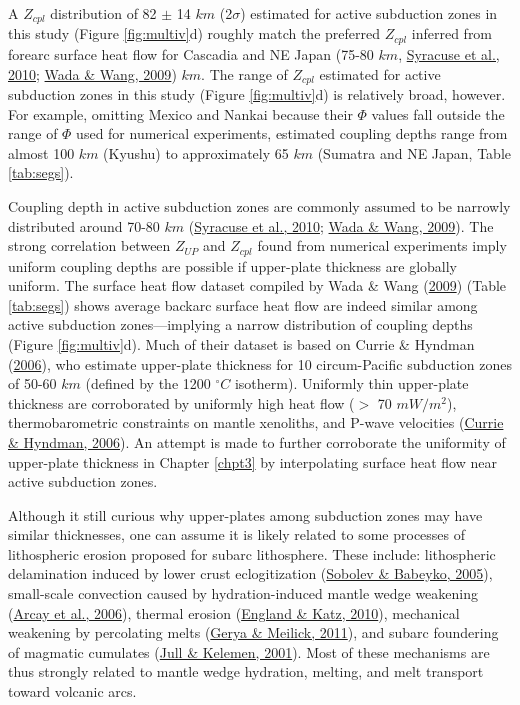 A \(Z_{cpl}\) distribution of 82 \(\pm\) 14 \(km\) (2\(\sigma\)) estimated for active subduction zones in this study (Figure \ref{fig:multiv}d) roughly match the preferred \(Z_{cpl}\) inferred from forearc surface heat flow for Cascadia and NE Japan (75-80 \(km\), \protect\hyperlink{ref-syracuse2010}{Syracuse et al., 2010}; \protect\hyperlink{ref-wada2009}{Wada \& Wang, 2009}) \(km\). The range of \(Z_{cpl}\) estimated for active subduction zones in this study (Figure \ref{fig:multiv}d) is relatively broad, however. For example, omitting Mexico and Nankai because their \(\Phi\) values fall outside the range of \(\Phi\) used for numerical experiments, estimated coupling depths range from almost 100 \(km\) (Kyushu) to approximately 65 \(km\) (Sumatra and NE Japan, Table \ref{tab:segs}).

Coupling depth in active subduction zones are commonly assumed to be narrowly distributed around 70-80 \(km\) (\protect\hyperlink{ref-syracuse2010}{Syracuse et al., 2010}; \protect\hyperlink{ref-wada2009}{Wada \& Wang, 2009}). The strong correlation between \(Z_{UP}\) and \(Z_{cpl}\) found from numerical experiments imply uniform coupling depths are possible if upper-plate thickness are globally uniform. The surface heat flow dataset compiled by Wada \& Wang (\protect\hyperlink{ref-wada2009}{2009}) (Table \ref{tab:segs}) shows average backarc surface heat flow are indeed similar among active subduction zones---implying a narrow distribution of coupling depths (Figure \ref{fig:multiv}d). Much of their dataset is based on Currie \& Hyndman (\protect\hyperlink{ref-currie2006}{2006}), who estimate upper-plate thickness for 10 circum-Pacific subduction zones of 50-60 \(km\) (defined by the 1200 \(^{\circ}C\) isotherm). Uniformly thin upper-plate thickness are corroborated by uniformly high heat flow (\(>\) 70 \(mW/m^{2}\)), thermobarometric constraints on mantle xenoliths, and P-wave velocities (\protect\hyperlink{ref-currie2006}{Currie \& Hyndman, 2006}). An attempt is made to further corroborate the uniformity of upper-plate thickness in Chapter \ref{chpt3} by interpolating surface heat flow near active subduction zones.

Although it still curious why upper-plates among subduction zones may have similar thicknesses, one can assume it is likely related to some processes of lithospheric erosion proposed for subarc lithosphere. These include: lithospheric delamination induced by lower crust eclogitization (\protect\hyperlink{ref-sobolev2005}{Sobolev \& Babeyko, 2005}), small-scale convection caused by hydration-induced mantle wedge weakening (\protect\hyperlink{ref-arcay2006}{Arcay et al., 2006}), thermal erosion (\protect\hyperlink{ref-england2010}{England \& Katz, 2010}), mechanical weakening by percolating melts (\protect\hyperlink{ref-gerya2011}{Gerya \& Meilick, 2011}), and subarc foundering of magmatic cumulates (\protect\hyperlink{ref-jull2001}{Jull \& Kelemen, 2001}). Most of these mechanisms are thus strongly related to mantle wedge hydration, melting, and melt transport toward volcanic arcs.

